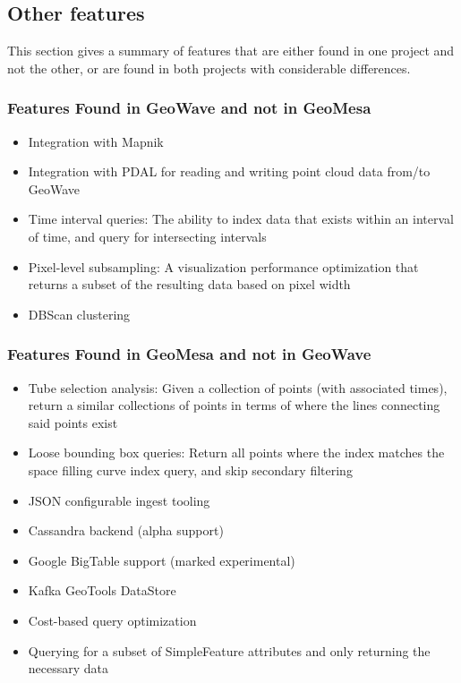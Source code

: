 \subsection{Other features}
\label{sec:featurecompare:other}

This section gives a summary of features that are either found in one project and not the other,
or are found in both projects with considerable differences.


\subsubsection{Features Found in GeoWave and not in GeoMesa}
\label{sec:featurecompare:other:wave}

\begin{itemize}
\item Integration with Mapnik
\item Integration with PDAL for reading and writing point cloud data from/to GeoWave
\item Time interval queries: The ability to index data that exists within an interval of time, and query for intersecting intervals
\item Pixel-level subsampling: A visualization performance optimization that returns a subset of the resulting data based on pixel width
\item DBScan clustering
\end{itemize}


\subsubsection{Features Found in GeoMesa and not in GeoWave}
\label{sec:featurecompare:other:mesa}

\begin{itemize}
\item Tube selection analysis: Given a collection of points (with associated times), return a similar collections of points in terms of where the lines connecting said points exist
\item Loose bounding box queries: Return all points where the index matches the space filling curve index query, and skip secondary filtering
\item JSON configurable ingest tooling
\item Cassandra backend (alpha support)
\item Google BigTable support (marked experimental)
\item Kafka GeoTools DataStore
\item Cost-based query optimization
\item Querying for a subset of SimpleFeature attributes and only returning the necessary data
\end{itemize}


